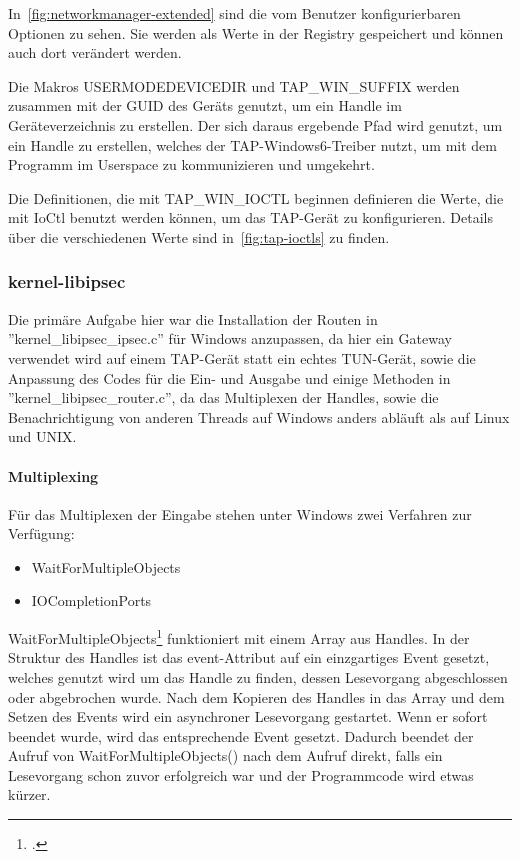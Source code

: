 {In~\autoref{fig:networkmanager-extended} sind die vom Benutzer konfigurierbaren Optionen zu sehen.
Sie werden als Werte in der Registry gespeichert und können auch dort verändert werden.

Die Makros USERMODEDEVICEDIR und TAP\_WIN\_SUFFIX werden zusammen mit der GUID des Geräts
genutzt, um ein Handle im Geräteverzeichnis zu erstellen. Der sich daraus ergebende Pfad
wird genutzt, um ein Handle zu erstellen, welches der TAP-Windows6-Treiber nutzt, um
mit dem Programm im Userspace zu kommunizieren und umgekehrt.

Die Definitionen, die mit TAP\_WIN\_IOCTL beginnen definieren die Werte, die mit
IoCtl benutzt werden können, um das TAP-Gerät zu konfigurieren. Details über die verschiedenen
Werte sind in~\autoref{fig:tap-ioctls} zu finden.


\subsubsection{kernel-libipsec}
Die primäre Aufgabe hier war die Installation der Routen in ''kernel\_libipsec\_ipsec.c''
für Windows anzupassen, da hier ein Gateway verwendet wird auf einem TAP-Gerät
statt ein echtes TUN-Gerät, sowie die Anpassung des Codes für die Ein- und Ausgabe 
und einige Methoden in
''kernel\_libipsec\_router.c'', da das Multiplexen der Handles, sowie die Benachrichtigung
von anderen Threads auf Windows anders abläuft als auf Linux und UNIX.

\paragraph{Multiplexing}
Für das Multiplexen der Eingabe stehen unter Windows zwei Verfahren zur Verfügung:
\begin{itemize}
\item WaitForMultipleObjects
\item IOCompletionPorts
\end{itemize}

WaitForMultipleObjects\footcite[][]{_waitformultipleobjects_2016} funktioniert mit einem Array aus Handles. In der Struktur des Handles
ist das event-Attribut auf ein einzgartiges Event gesetzt, welches genutzt wird um
das Handle zu finden, dessen Lesevorgang abgeschlossen oder abgebrochen wurde.
Nach dem Kopieren des Handles in das Array und dem Setzen des Events wird ein asynchroner
Lesevorgang gestartet. Wenn er sofort beendet wurde, wird das entsprechende Event gesetzt.
Dadurch beendet der Aufruf von WaitForMultipleObjects() nach dem Aufruf direkt, falls
ein Lesevorgang schon zuvor erfolgreich war und der Programmcode wird etwas kürzer.

}
